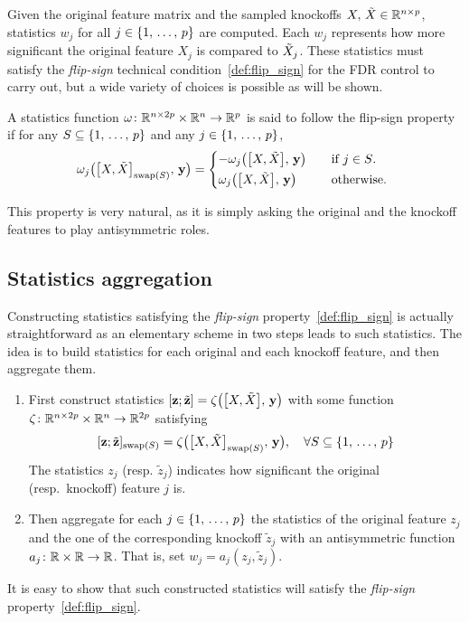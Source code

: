 Given the original feature matrix and the sampled knockoffs $X,\, \tilde{X} \in \mathbb{R}^{n \times p}$,
statistics $w_j$ for all $j \in \left\{ 1,\, \dots,\, p \right\}$ are computed.
Each $w_j$ represents how more significant the original feature $X_j$ is compared to $\tilde{X}_j$.
These statistics must satisfy the \emph{flip-sign} technical condition~\ref{def:flip_sign}
for the FDR control to carry out,
but a wide variety of choices is possible as will be shown.
\begin{definition}\label{def:flip_sign}
A statistics function $\omega \colon \mathbb{R}^{n \times 2p} \times \mathbb{R}^n \to \mathbb{R}^p$
is said to follow the flip-sign property if for any $S \subseteq \left\{ 1,\, \dots,\, p \right\}$ and any $j \in \left\{ 1,\, \dots,\, p \right\}$,
\begin{equation*}
    \omega_j\big( \big[ X, \tX \big]_{\swap(S)},\, \yy \big) = \begin{cases*}
        -\omega_j\big( \big[ X, \tX \big],\, \yy \big) &\quad\text{if $j \in S$.}\\
        \omega_j\big( \big[ X, \tX \big],\, \yy \big) &\quad\text{otherwise.}
    \end{cases*}
\end{equation*}
\end{definition}
This property is very natural,
as it is simply asking the original and the knockoff features to play antisymmetric roles.

\subsection{Statistics aggregation}\label{subsec:ksa}

Constructing statistics satisfying the \emph{flip-sign} property~\ref{def:flip_sign} is actually straightforward
as an elementary scheme in two steps leads to such statistics.
The idea is to build statistics for each original and each knockoff feature, and then aggregate them.
\begin{enumerate}
    \item First construct statistics $[ \mathbf{z} ; \tilde{\mathbf{z}} ] = \zeta\big( \big[ X, \tilde{X} \big],\, \mathbf{y} \big)$
        with some function $\zeta \colon \mathbb{R}^{n \times 2p} \times \mathbb{R}^n \to \mathbb{R}^{2p}$ satisfying
        \begin{equation}\label{eq:swap_cond}
        [ \mathbf{z} ; \tilde{\mathbf{z}} ]_{\operatorname{swap}(S)} = \zeta\big( \big[ X, \tilde{X} \big]_{\operatorname{swap}(S)},\, \mathbf{y} \big)
        ,\quad
        \forall S \subseteq \left\{ 1,\, \dots,\, p \right\}
        \end{equation}
        The statistics $z_j$ (resp. $\tilde{z}_j$) indicates how significant the original (resp.\ knockoff) feature $j$ is.
    \item Then aggregate for each $j \in \left\{ 1,\, \dots,\, p \right\}$ the statistics of the original feature $z_j$ and the one of the corresponding
        knockoff $\tilde{z}_j$ with an antisymmetric function $a_j \colon \mathbb{R}\times\mathbb{R} \to \mathbb{R}$.
        That is, set $w_j = a_j(z_j, \tilde{z}_j)$.
\end{enumerate}
It is easy to show that such constructed statistics will satisfy the \emph{flip-sign} property~\ref{def:flip_sign}.


